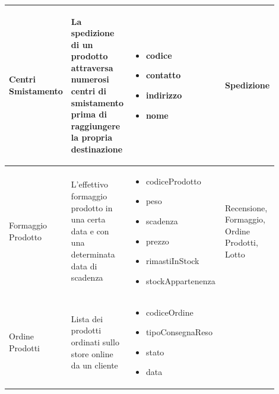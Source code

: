 \documentclass[12pt,a4paper]{article}
\begin{document}
\begin{center}
\begin{longtable}{|p{0.14\linewidth}|p{0.20\linewidth}|p{0.36\linewidth}|p{0.20\linewidth}|}
\hline
Centri Smistamento 	& \begin{flushleft}\vspace{-25pt} La spedizione di un prodotto attraversa numerosi centri di smistamento prima di raggiungere la propria destinazione  \end{flushleft}
					& \begin{itemize}
						\setlength{\itemindent}{-1em}
						\vspace{-25pt}
						\setlength\itemsep{-0.25em}
						\item codice
						\item contatto
						\item indirizzo
						\item nome
					\end{itemize}
					& \begin{flushleft}\vspace{-25pt} Spedizione \end{flushleft} \\ 

\hline
Formaggio Prodotto 	& \begin{flushleft}\vspace{-25pt} L'effettivo formaggio prodotto in una certa data e con una determinata data di scadenza  \end{flushleft}
					& \begin{itemize}
						\setlength{\itemindent}{-1em}
						\vspace{-25pt}
						\setlength\itemsep{-0.25em}
						\item codiceProdotto
						\item peso
						\item scadenza
						\item prezzo
						\item rimastiInStock
						\item stockAppartenenza
						
					\end{itemize}
					& \begin{flushleft}\vspace{-25pt} Recensione, Formaggio, Ordine Prodotti, Lotto \end{flushleft} \\ 

\hline
Ordine Prodotti 		& \begin{flushleft}\vspace{-25pt} Lista dei prodotti ordinati sullo store online da un cliente  \end{flushleft}
					& \begin{itemize}
						\setlength{\itemindent}{-1em}
						\vspace{-25pt}
						\setlength\itemsep{-0.25em}
						\item codiceOrdine
						\item tipoConsegnaReso
						\item stato
						\item data
						

\end{itemize}
\end{longtable}
\end{center}
\end{document}
